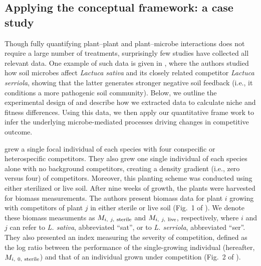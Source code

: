 \subsection{Applying the conceptual framework: a case study}
Though fully quantifying plant--plant and plant--microbe interactions does not require a large number of treatments, surprisingly few studies have collected all relevant data. One example of such data is given in \citet{Aguilera2017}, where the authors studied how soil microbes affect \textit{Lactuca sativa} and its closely related competitor \textit{Lactuca serriola}, showing that the latter generates stronger negative soil feedback (i.e., it conditions a more pathogenic soil community).
Below, we outline the experimental design of \citet{Aguilera2017} and describe how we extracted data to calculate niche and fitness differences. Using this data, we then apply our quantitative frame work to infer the underlying microbe-mediated processes driving changes in competitive outcome.
\par


\citet{Aguilera2017} grew a single focal individual of each species with four conspecific or heterospecific competitors. They also grew one single individual of each species alone with no background competitors, creating a density gradient (i.e., zero versus four) of competitors. Moreover, this planting scheme was conducted using either sterilized or live soil.
After nine weeks of growth, the plants were harvested for biomass measurements.
The authors present biomass data for plant $i$ growing with competitors of plant $j$ in either sterile or live soil (Fig.~1 of \citealp{Aguilera2017}). We denote these biomass measuments as $M_{i,\ j,\ \textup{sterile}}$ and $M_{i,\ j,\ \textup{live}}$, respectively, where $i$ and $j$ can refer to \textit{L. sativa}, abbreviated ``sat'', or to \textit{L. serriola}, abbreviated ``ser''.
They also presented an index measuring the severity of competition, defined as the log ratio between the performance of the single-growing individual (hereafter, $M_{i,\ 0,\ \textup{sterile}}$) and that of an individual grown under competition (Fig.~2 of \citealp{Aguilera2017}).
\par


